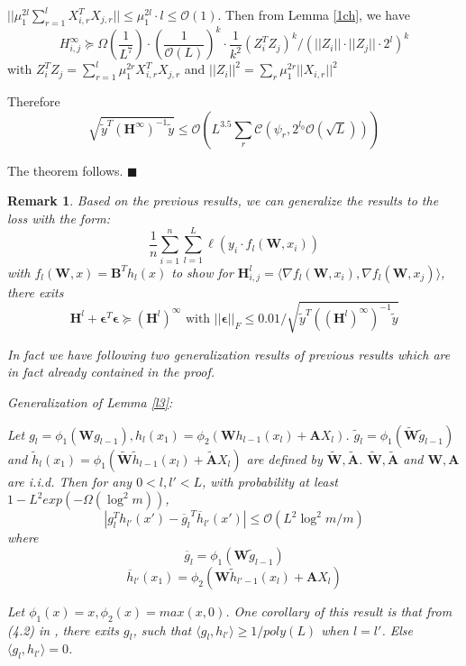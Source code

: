 \documentclass{article}
\newcommand{\cO}{\mathcal{O}}
\newtheorem{rem}{\textbf{Remark}}[section]
\newcommand*{\QEDA}{\hfill\ensuremath{\blacksquare}}%
\begin{document}
$||\mu_1^{2l} \sum_{r=1}^l X_{i,r}^TX_{j,r}||\leq \mu_1^{2l} \cdot l\leq \cO(1)$. Then from Lemma \ref{1ch}, we have
\begin{equation}
H^{\infty}_{i,j}\succeq\Omega( \frac{1}{L^7}) \cdot (\frac{1}{\cO(L)})^{k}\cdot \frac{1}{k^2} (Z_{i}^TZ_{j})^{k}/(||Z_{i}||\cdot ||Z_{j}||\cdot 2^{l})^{k}
\end{equation}
with $Z_{i}^TZ_{j}= \sum_{r=1}^l  \mu_1^{2r}X_{i,r}^TX_{j,r}$ and $||Z_{i}||^2=\sum_r  \mu_1^{2r}||X_{i,r}||^2$

Therefore
$$\sqrt{\widetilde{y}^T (\bm{H}^\infty)^{-1}\widetilde{y}}\leq \cO(L^{3.5}\sum_r\mathscr{C}(\psi_{r},2^{l_0}\cO(\sqrt{L})))$$

The theorem follows.
\QEDA
\begin{rem}\label{g1}
Based on the previous results, we can generalize the results to the loss with the form: $$\frac{1}{n}\sum_{i=1}^n\sum_{l=1}^L\ell(y_i\cdot f_l(\bm{W},x_i))$$ with $f_l(\bm{W},x)=\bm{B}^Th_l(x)$ to show for $\bm{H}^l_{i,j}=\langle \nabla f_l(\bm{W},x_i), \nabla f_l(\bm{W},x_j)\rangle$, there exits
 \begin{equation}
\bm{H}^l +\bm{\epsilon}^T\bm{\epsilon} \succeq (\bm{H}^l)^\infty \text{ with } ||\bm{\epsilon}||_F\leq 0.01/ \sqrt{ \widetilde{y}^T ((\bm{H}^l)^\infty)^{-1}\widetilde{y}}
\end{equation}

In fact we have following two generalization results of previous results which are in fact already contained in the proof.

Generalization of Lemma \ref{l3}:

Let $g_l=\phi_1(\bm{W}g_{l-1}),   h_l(x_1)=\phi_2(\bm{W}h_{l-1}(x_l)+\bm{A}X_l)$. $\widetilde{g}_l=\phi_1(\widetilde{\bm{W}}\widetilde{g}_{l-1})$ and $\widetilde{h}_l(x_1)=\phi_1(\widetilde{\bm{W}}\widetilde{h}_{l-1}(x_l)+\widetilde{\bm{A}}X_l)$ are defined by  $\widetilde{\bm{W}}, \widetilde{\bm{A}}$. $\widetilde{\bm{W}}, \widetilde{\bm{A}}$ and $\bm{W}, \bm{A}$ are i.i.d. Then for any $0<l,l'<L$, with probability at least $1-L^2exp(-\Omega(\log^2m))$,
\begin{equation}
|g_{l}^Th_{l'}(x')-  {\overline{g}_{l}}^{T}\overline{h}_{l'}(x')|\leq \cO(L^2\log^2m/m)
\end{equation}
where
$$\overline{g}_l=\phi_1(\bm{W}\widetilde{g}_{l-1})$$
$$\overline{h}_{l'}(x_1)=\phi_2(\bm{W}\widetilde{h}_{l'-1}(x_l)+\bm{A}X_l)$$


Let $\phi_1(x)=x, \phi_2(x)=max(x,0)$. One corollary of this result is that  from (4.2) in \cite{rate}, there exits  $g_l$, such that  $\langle g_l, h_{l'}\rangle \geq 1/poly(L)$ when $l=l'$. Else $\langle g_l, h_{l'}\rangle =0$.


\end{rem}
\end{document}
